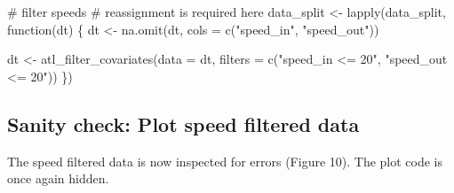 \documentclass[]{scrreprt}
\newenvironment{Shaded}{}{}
\newcommand{\CommentTok}[1]{\textcolor[rgb]{0.00,0.50,0.00}{#1}}
\newcommand{\ControlFlowTok}[1]{\textcolor[rgb]{0.00,0.00,1.00}{#1}}
\newcommand{\DataTypeTok}[1]{#1}
\newcommand{\KeywordTok}[1]{\textcolor[rgb]{0.00,0.00,1.00}{#1}}
\newcommand{\NormalTok}[1]{#1}
\newcommand{\StringTok}[1]{\textcolor[rgb]{0.00,0.50,0.50}{#1}}
\begin{document}
\begin{Shaded}
\begin{Highlighting}[]
\CommentTok{# filter speeds}
\CommentTok{# reassignment is required here}
\NormalTok{data_split <-}\StringTok{ }\KeywordTok{lapply}\NormalTok{(data_split, }\ControlFlowTok{function}\NormalTok{(dt) \{}
\NormalTok{  dt <-}\StringTok{ }\KeywordTok{na.omit}\NormalTok{(dt, }\DataTypeTok{cols =} \KeywordTok{c}\NormalTok{(}\StringTok{"speed_in"}\NormalTok{, }\StringTok{"speed_out"}\NormalTok{))}
  
\NormalTok{  dt <-}\StringTok{ }\KeywordTok{atl_filter_covariates}\NormalTok{(}\DataTypeTok{data =}\NormalTok{ dt,}
                              \DataTypeTok{filters =} \KeywordTok{c}\NormalTok{(}\StringTok{"speed_in <= 20"}\NormalTok{,}
                                          \StringTok{"speed_out <= 20"}\NormalTok{))}
\NormalTok{\})}
\end{Highlighting}
\end{Shaded}

\hypertarget{sanity-check-plot-speed-filtered-data}{%
\subsection{Sanity check: Plot speed filtered data}\label{sanity-check-plot-speed-filtered-data}}

The speed filtered data is now inspected for errors (Figure 10). The plot code is once again hidden.
\end{document}
